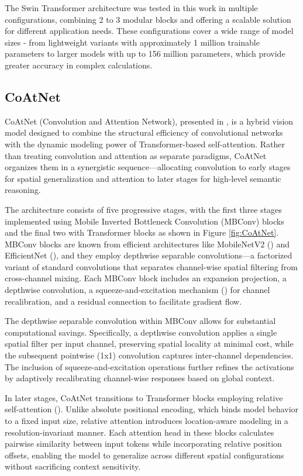 \documentclass[a4paper,11pt,twoside]{report}
\theoremstyle{definition}
\begin{document}
The Swin Transformer architecture was tested in this work in multiple configurations, combining 2 to 3 modular blocks and offering a scalable solution for different application needs. These configurations cover a wide range of model sizes - from lightweight variants with approximately 1 million trainable parameters to larger models with up to 156 million parameters, which provide greater accuracy in complex calculations.

\subsection{CoAtNet}

CoAtNet (Convolution and Attention Network), presented in \cite{CoAtNet}, is a hybrid vision model designed to combine the structural efficiency of convolutional networks with the dynamic modeling power of Transformer-based self-attention. Rather than treating convolution and attention as separate paradigms, CoAtNet organizes them in a synergistic sequence—allocating convolution to early stages for spatial generalization and attention to later stages for high-level semantic reasoning.

The architecture consists of five progressive stages, with the first three stages implemented using Mobile Inverted Bottleneck Convolution (MBConv) blocks and the final two with Transformer blocks as shown in Figure \ref{fig:CoAtNet}. MBConv blocks are known from efficient architectures like MobileNetV2 (\cite{mobilenetv2}) and EfficientNet (\cite{efficientnet}), and they employ depthwise separable convolutions—a factorized variant of standard convolutions that separates channel-wise spatial filtering from cross-channel mixing. Each MBConv block includes an expansion projection, a depthwise convolution, a squeeze-and-excitation mechanism (\cite{squeeze}) for channel recalibration, and a residual connection to facilitate gradient flow.


The depthwise separable convolution within MBConv allows for substantial computational savings. Specifically, a depthwise convolution applies a single spatial filter per input channel, preserving spatial locality at minimal cost, while the subsequent pointwise (1x1) convolution captures inter-channel dependencies. The inclusion of squeeze-and-excitation operations further refines the activations by adaptively recalibrating channel-wise responses based on global context.

In later stages, CoAtNet transitions to Transformer blocks employing relative self-attention (\cite{relation}). Unlike absolute positional encoding, which binds model behavior to a fixed input size, relative attention introduces location-aware modeling in a resolution-invariant manner. Each attention head in these blocks calculates pairwise similarity between input tokens while incorporating relative position offsets, enabling the model to generalize across different spatial configurations without sacrificing context sensitivity.
\end{document}
